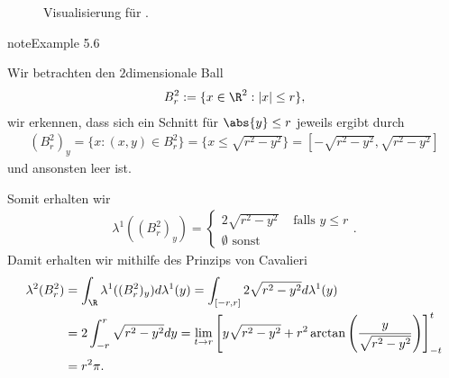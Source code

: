 \documentclass[letterpaper,10pt,german]{jupyterBook}
\let\sphinxpxdimen\pdfpxdimen\else\newdimen\sphinxpxdimen
\begin{document}
\begin{figure}[htbp]
\centering
\capstart

\noindent\sphinxincludegraphics[width=600\sphinxpxdimen]{{ball}.jpg}
\caption{Visualisierung für {\hyperref[\detokenize{masstheorie/integrationstechnik:ex:ball}]{}}.}\label{\detokenize{masstheorie/integrationstechnik:fig-ball}}\end{figure}
\label{masstheorie/integrationstechnik:ex:ball}
\begin{sphinxadmonition}{note}{Example 5.6}



\sphinxAtStartPar
Wir betrachten den \(2\)\sphinxhyphen{}dimensionale Ball
\begin{equation*}
\begin{split}B_r^2:=\{x\in\R^2: |x|\leq r\},\end{split}
\end{equation*}
\sphinxAtStartPar
wir erkennen, dass sich ein Schnitt für \(\abs{y}\leq r\) jeweils ergibt durch
\begin{equation*}
\begin{split}(B_r^2)_y = \{x:(x,y)\in B_r^2\} = \{x\leq\sqrt{r^2-y^2}\} = [-\sqrt{r^2-y^2},\sqrt{r^2-y^2}]\end{split}
\end{equation*}
\sphinxAtStartPar
und ansonsten leer ist.

\sphinxAtStartPar
Somit erhalten wir
\begin{equation*}
\begin{split}\lambda^1((B_r^2)_y) = 
\begin{cases}
2 \sqrt{r^2-y^2}&\text{ falls }y\leq r\\
\emptyset\text{ sonst}
\end{cases}.\end{split}
\end{equation*}
\sphinxAtStartPar
Damit erhalten wir mithilfe des Prinzips von Cavalieri
\begin{equation*}
\begin{split}\lambda^2(B_r^2) &= \int_{\R} \lambda^1((B_r^2)_y) d\lambda^1(y) = 
\int_{[-r,r]} 2 \sqrt{r^2-y^2} d\lambda^1(y)\\
&= 
2\int_{-r}^r \sqrt{r^2 - y^2} dy = 
\lim_{t\to r}\left[y \sqrt{r^2-y^2} +r^2\arctan\left(\frac{y}{\sqrt{r^2-y^2}}\right)\right]^t_{-t}\\
&=
r^2\pi.\end{split}
\end{equation*}\end{sphinxadmonition}
\end{document}
